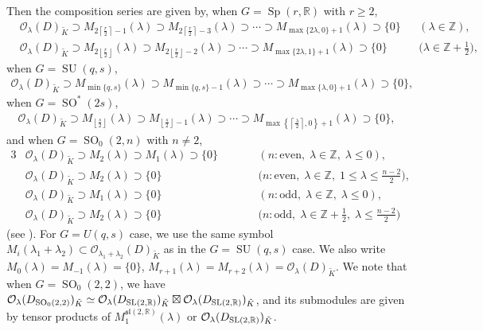 \documentclass[pdftex]{sigma}
\numberwithin{equation}{section}
\newcommand{\BZ}{\mathbb{Z}}
\newcommand{\BR}{\mathbb{R}}
\newcommand{\cO}{\mathcal{O}}
\begin{document}
Then the composition series are given by, when $G=\operatorname{Sp}(r,\BR)$ with $r\ge 2$,
\begin{align*}
&\cO_\lambda(D)_{\tilde{K}}\supset M_{2\left\lceil\frac{r}{2}\right\rceil-1}(\lambda)\supset M_{2\left\lceil\frac{r}{2}\right\rceil-3}(\lambda)
\supset\cdots\supset M_{\max\{2\lambda,0\}+1}(\lambda)\supset\{0\} && (\lambda\in\BZ), \\
&\cO_\lambda(D)_{\tilde{K}}\supset M_{2\left\lfloor\frac{r}{2}\right\rfloor}(\lambda)\supset M_{2\left\lfloor\frac{r}{2}\right\rfloor-2}(\lambda)
\supset\cdots\supset M_{\max\{2\lambda,1\}+1}(\lambda)\supset\{0\} && \big(\lambda\in\BZ+ \tfrac{1}{2}\big),
\end{align*}
when $G=\operatorname{SU}(q,s)$,
\begin{gather*} \cO_\lambda(D)_{\tilde{K}}\supset M_{\min\{q,s\}}(\lambda)\supset M_{\min\{q,s\}-1}(\lambda)
\supset\cdots\supset M_{\max\{\lambda,0\}+1}(\lambda)\supset\{0\}, \end{gather*}
when $G=\operatorname{SO}^*(2s)$,
\begin{gather*} \cO_\lambda(D)_{\tilde{K}}\supset M_{\left\lfloor\frac{s}{2}\right\rfloor}(\lambda)\supset M_{\left\lfloor\frac{s}{2}\right\rfloor-1}(\lambda)
\supset\cdots\supset M_{\max\left\{\left\lceil\frac{\lambda}{2}\right\rceil,0\right\}+1}(\lambda)\supset\{0\}, \end{gather*}
and when $G=\operatorname{SO}_0(2,n)$ with $n\ne 2$,
\begin{alignat*}{3}
&\cO_\lambda(D)_{\tilde{K}}\supset M_2(\lambda)\supset M_1(\lambda)\supset\{0\} \qquad & &(n\colon \text{even},\;\lambda\in\BZ,\;\lambda\le 0),&\\
&\cO_\lambda(D)_{\tilde{K}}\supset M_2(\lambda)\supset\{0\}\qquad & &\big(n\colon \text{even},\;\lambda\in\BZ,\;1\le\lambda\le \tfrac{n-2}{2}\big),&\\
&\cO_\lambda(D)_{\tilde{K}}\supset M_1(\lambda)\supset\{0\} \qquad& &(n\colon \text{odd},\;\lambda\in\BZ,\;\lambda\le 0),&\\
&\cO_\lambda(D)_{\tilde{K}}\supset M_2(\lambda)\supset\{0\} \qquad& &\big(n\colon \text{odd},\;\lambda\in\BZ+ \tfrac{1}{2},\;\lambda\le \tfrac{n-2}{2}\big)&
\end{alignat*}
(see \cite{FK0}). For $G=U(q,s)$ case, we use the same symbol $M_i(\lambda_1+\lambda_2)\subset\cO_{\lambda_1+\lambda_2}(D)_{\tilde{K}}$ as in the $G=\operatorname{SU}(q,s)$ case. We also write $M_0(\lambda)=M_{-1}(\lambda)=\{0\}$, $M_{r+1}(\lambda)=M_{r+2}(\lambda)=\cO_\lambda(D)_{\tilde{K}}$. We note that when $G=\operatorname{SO}_0(2,2)$, we have $\cO_\lambda(D_{\operatorname{SO}_0(2,2)})_{\tilde{K}}\simeq \cO_\lambda(D_{{\rm SL}(2,\BR)})_{\tilde{K}}\boxtimes\cO_\lambda(D_{{\rm SL}(2,\BR)})_{\tilde{K}}$, and its submodules are given by tensor products of $M_1^{\mathfrak{sl}(2,\BR)}(\lambda)$ or $\cO_\lambda(D_{{\rm SL}(2,\BR)})_{\tilde{K}}$.
\end{document}
